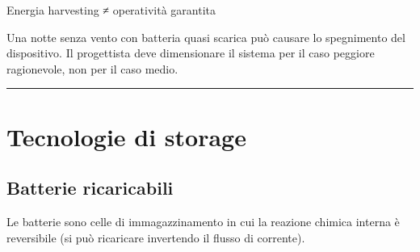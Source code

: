 \documentclass[
  italian,
  openany]{book}
\begin{document}
\begin{calloutwarning}{Energia harvesting ≠ operatività garantita}

Una notte senza vento con batteria quasi scarica può causare lo
spegnimento del dispositivo. Il progettista deve dimensionare il sistema
per il caso peggiore ragionevole, non per il caso medio.

\end{calloutwarning}

\begin{center}\rule{0.5\linewidth}{0.5pt}\end{center}

\section{Tecnologie di storage}\label{tecnologie-di-storage}

\subsection{Batterie ricaricabili}\label{batterie-ricaricabili}

Le batterie sono celle di immagazzinamento in cui la reazione chimica
interna è reversibile (si può ricaricare invertendo il flusso di
corrente).
\end{document}
